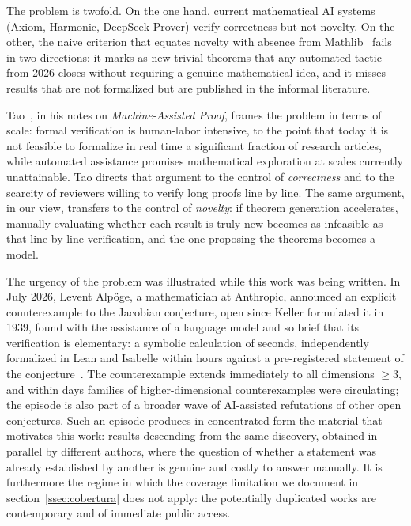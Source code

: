 \documentclass[12pt,a4paper]{article}
\theoremstyle{remark}
\begin{document}
The problem is twofold. On the one hand, current mathematical AI systems (Axiom, Harmonic, DeepSeek-Prover) verify correctness but not novelty. On the other, the naive criterion that equates novelty with absence from Mathlib~\cite{kasaura2025} fails in two directions: it marks as new trivial theorems that any automated tactic from 2026 closes without requiring a genuine mathematical idea, and it misses results that are not formalized but are published in the informal literature.

Tao~\cite{tao2025}, in his notes on \textit{Machine-Assisted Proof}, frames the problem in terms of scale: formal verification is human-labor intensive, to the point that today it is not feasible to formalize in real time a significant fraction of research articles, while automated assistance promises mathematical exploration at scales currently unattainable. Tao directs that argument to the control of \emph{correctness} and to the scarcity of reviewers willing to verify long proofs line by line. The same argument, in our view, transfers to the control of \emph{novelty}: if theorem generation accelerates, manually evaluating whether each result is truly new becomes as infeasible as that line-by-line verification, and the one proposing the theorems becomes a model.

The urgency of the problem was illustrated while this work was being written. In July 2026, Levent Alp\"oge, a mathematician at Anthropic, announced an explicit counterexample to the Jacobian conjecture, open since Keller formulated it in 1939, found with the assistance of a language model and so brief that its verification is elementary: a symbolic calculation of seconds, independently formalized in Lean and Isabelle within hours against a pre-registered statement of the conjecture~\cite{alpoge2026}. The counterexample extends immediately to all dimensions $\geq 3$, and within days families of higher-dimensional counterexamples were circulating; the episode is also part of a broader wave of AI-assisted refutations of other open conjectures. Such an episode produces in concentrated form the material that motivates this work: results descending from the same discovery, obtained in parallel by different authors, where the question of whether a statement was already established by another is genuine and costly to answer manually. It is furthermore the regime in which the coverage limitation we document in section~\ref{ssec:cobertura} does not apply: the potentially duplicated works are contemporary and of immediate public access.
\end{document}
